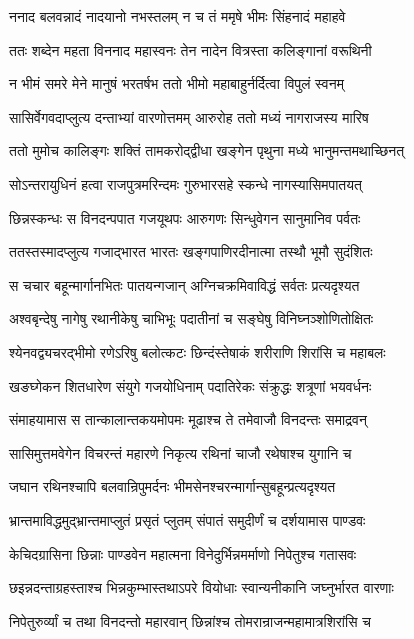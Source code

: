 \twolineshloka
{ननाद बलवन्नादं नादयानो नभस्तलम्}
{न च तं ममृषे भीमः सिंहनादं महाहवे}


\twolineshloka
{ततः शब्देन महता विननाद महास्वनः}
{तेन नादेन वित्रस्ता कलिङ्गानां वरूथिनी}


\twolineshloka
{न भीमं समरे मेने मानुषं भरतर्षभ}
{ततो भीमो महाबाहुर्नर्दित्वा विपुलं स्वनम्}


\twolineshloka
{सासिर्वेगवदाप्लुत्य दन्ताभ्यां वारणोत्तमम्}
{आरुरोह ततो मध्यं नागराजस्य मारिष}


\twolineshloka
{ततो मुमोच कालिङ्गः शक्तिं तामकरोद्द्वीधा}
{खङ्गेन पृथुना मध्ये भानुमन्तमथाच्छिनत्}


\twolineshloka
{सोऽन्तरायुधिनं हत्वा राजपुत्रमरिन्दमः}
{गुरुभारसहे स्कन्धे नागस्यासिमपातयत्}


\twolineshloka
{छिन्नस्कन्धः स विनदन्पपात गजयूथपः}
{आरुगणः सिन्धुवेगन सानुमानिव पर्वतः}


\twolineshloka
{ततस्तस्मादप्लुत्य गजाद्भारत भारतः}
{खङ्गपाणिरदीनात्मा तस्थौ भूमौ सुदंशितः}


\twolineshloka
{स चचार बहून्मार्गानभितः पातयन्गजान्}
{अग्निचक्रमिवाविद्धं सर्वतः प्रत्यदृश्यत}


\threelineshloka
{अश्वबृन्देषु नागेषु रथानीकेषु चाभिभूः}
{पदातीनां च सङ्घेषु विनिघ्नञ्शोणितोक्षितः}
{}


\twolineshloka
{श्येनवद्व्यचरद्भीमो रणेऽरिषु बलोत्कटः}
{छिन्दंस्तेषाकं शरीराणि शिरांसि च महाबलः}


\twolineshloka
{खङघ्गेकन शितधारेण संयुगे गजयोधिनाम्}
{पदातिरेकः संक्रुद्धः शत्रूणां भयवर्धनः}


\twolineshloka
{संमाहयामास स तान्कालान्तकयमोपमः}
{मूढाश्च ते तमेवाजौ विनदन्तः समाद्रवन्}


\twolineshloka
{सासिमुत्तमवेगेन विचरन्तं महारणे}
{निकृत्य रथिनां चाजौ रथेषाश्च युगानि च}


\twolineshloka
{जघान रथिनश्चापि बलवान्रिपुमर्दनः}
{भीमसेनश्चरन्मार्गान्सुबहून्प्रत्यदृश्यत}


\twolineshloka
{भ्रान्तमाविद्धमुद्भ्रान्तमाप्लुतं प्रसृतं प्लुतम्}
{संपातं समुदीर्णं च दर्शयामास पाण्डवः}


\twolineshloka
{केचिदग्रासिना छिन्नाः पाण्डवेन महात्मना}
{विनेदुर्भिन्नमर्माणो निपेतुश्च गतासवः}


\threelineshloka
{छइन्नदन्ताग्रहस्ताश्च भिन्नकुम्भास्तथाऽपरे}
{वियोधाः स्वान्यनीकानि जघ्नुर्भारत वारणाः}
{}


\twolineshloka
{निपेतुरुर्व्यां च तथा विनदन्तो महारवान्}
{छिन्नांश्च तोमरान्राजन्महामात्रशिरांसि च}


